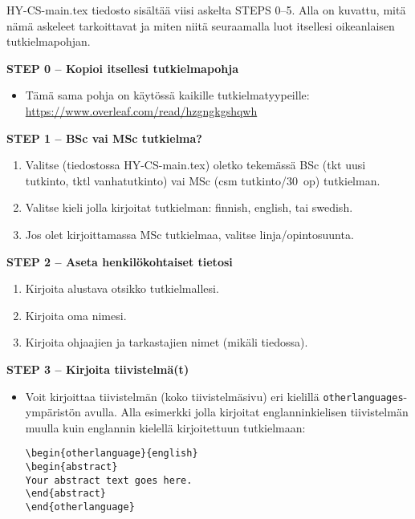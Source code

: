 


HY-CS-main.tex tiedosto sisältää viisi askelta STEPS 0--5. Alla on kuvattu, mitä nämä askeleet tarkoittavat ja miten niitä seuraamalla luot itsellesi oikeanlaisen tutkielmapohjan.
\vspace{0.5cm}

\textbf{STEP 0 -- Kopioi itsellesi tutkielmapohja}

\begin{itemize}
\item Tämä sama pohja on käytössä kaikille tutkielmatyypeille:\\ \url{https://www.overleaf.com/read/hzgngkgshqwh}
\end{itemize}


{\textbf{STEP 1 -- BSc vai MSc tutkielma?}}
\begin{enumerate}
\item Valitse (tiedostossa HY-CS-main.tex) oletko tekemässä BSc (tkt uusi tutkinto, tktl vanhatutkinto) vai MSc (csm tutkinto/30~op)
tutkielman.
\item Valitse kieli jolla kirjoitat tutkielman: finnish, english, tai swedish.
\item Jos olet kirjoittamassa MSc tutkielmaa, valitse linja/opintosuunta.
\end{enumerate}


{\textbf{STEP 2 -- Aseta henkilökohtaiset tietosi}}

\begin{enumerate}
\item Kirjoita alustava otsikko tutkielmallesi.
\item Kirjoita oma nimesi.
\item Kirjoita ohjaajien ja tarkastajien nimet (mikäli tiedossa).
\end{enumerate}

{\textbf{STEP 3 -- Kirjoita tiivistelmä(t)}}

\begin{itemize}
\item Voit kirjoittaa tiivistelmän (koko tiivistelmäsivu) eri kielillä \texttt{otherlanguages}-ympäristön avulla. Alla esimerkki jolla kirjoitat englanninkielisen tiivistelmän muulla kuin englannin kielellä kirjoitettuun tutkielmaan:

\begin{verbatim}
\begin{otherlanguage}{english} 
\begin{abstract}
Your abstract text goes here. 
\end{abstract} 
\end{otherlanguage}
\end{verbatim}

\end{itemize}

